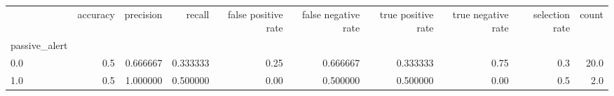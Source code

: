 \begin{tabular}{lrrrrrrrrr}
\toprule
{} &  accuracy &  precision &    recall &  false positive rate &  false negative rate &  true positive rate &  true negative rate &  selection rate &  count \\
passive\_alert &           &            &           &                      &                      &                     &                     &                 &        \\
\midrule
0.0           &       0.5 &   0.666667 &  0.333333 &                 0.25 &             0.666667 &            0.333333 &                0.75 &             0.3 &   20.0 \\
1.0           &       0.5 &   1.000000 &  0.500000 &                 0.00 &             0.500000 &            0.500000 &                0.00 &             0.5 &    2.0 \\
\bottomrule
\end{tabular}
